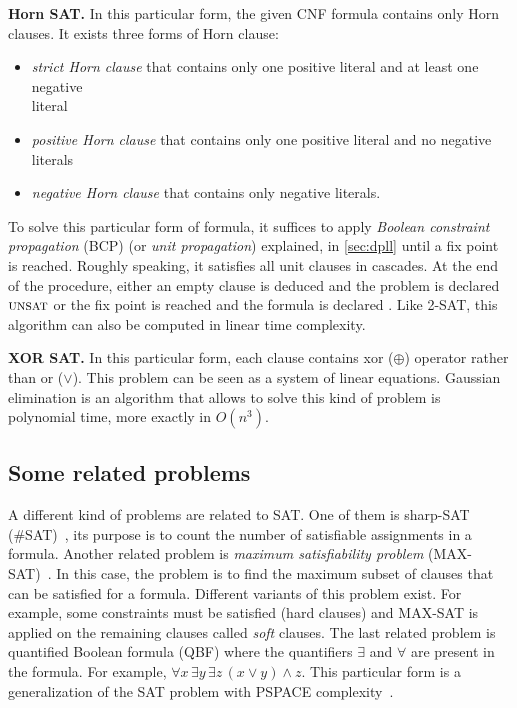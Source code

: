 \textbf{Horn SAT.}\cite{dowling1984linear} In this particular form, the given CNF formula contains only Horn clauses. It exists three forms
of Horn clause: 
\begin{itemize}[topsep=0pt,itemsep=1pt]
\item \emph{strict Horn clause} that contains only one positive literal and at least one negative \\literal
\item \emph{positive Horn clause} that contains only one positive literal and no negative literals
\item \emph{negative Horn clause} that contains only negative literals.
\end{itemize}
To solve this particular form of formula, it suffices to  apply \emph{Boolean constraint propagation} (BCP) (or \emph{unit propagation}) explained, in \cref{sec:dpll} until a fix point
is reached.
Roughly speaking, it satisfies all unit clauses in cascades. At the end of the procedure, either an empty clause is deduced and the problem
is declared $\textsc{unsat}$ or the fix point is reached and the formula is declared \sat.
 Like 2-SAT, this algorithm can also be computed in linear time complexity.
 
\textbf{XOR SAT.}\cite{moore2011nature} In this particular form, each clause contains xor ($\oplus$) operator rather than or ($\lor$).
This problem can be seen as a system of linear equations. Gaussian elimination is an algorithm that allows to solve this kind of
problem is polynomial time, more exactly in $O(n^3)$.

\subsection{Some related problems}
A different kind of problems are related to SAT.
One of them is sharp-SAT (\#SAT)~\cite{valiant1979complexity}, its purpose is to count the number of satisfiable assignments in a formula.
Another related problem is \textit{maximum satisfiability problem} (MAX-SAT)~\cite{biere2009handbook}. In this case, the problem
is to find the maximum subset of clauses that can be satisfied for a formula. Different variants
of this problem exist. For example, some constraints must be satisfied (hard clauses) and MAX-SAT
is applied on the remaining clauses called \emph{soft} clauses.
The last related problem is quantified Boolean formula (QBF) where the quantifiers $\exists$ and
$\forall$ are present in the formula. For example, $\forall x\, \exists y\, \exists z \, (x \lor y) \land z$.
This particular form is a generalization of the SAT problem with PSPACE complexity~\cite{garey2002computers}.

